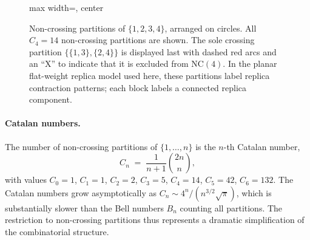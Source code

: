 \documentclass[11pt,letterpaper]{article}
\theoremstyle{plain}
\theoremstyle{definition}
\theoremstyle{remark}
\begin{document}
\begin{figure}[t]
\begin{adjustbox}{max width=\textwidth, center}
\end{adjustbox}
\caption{Non-crossing partitions of $\{1,2,3,4\}$, arranged on circles.
  All $C_4 = 14$ non-crossing partitions are shown.  The sole crossing
  partition $\{\{1,3\},\{2,4\}\}$ is displayed last with dashed red arcs
  and an ``X'' to indicate that it is excluded from $\mathrm{NC}(4)$.
  In the planar flat-weight replica model used here, these partitions label
  replica contraction patterns; each block labels a connected replica component.}
\label{fig07:nc_partitions}
\end{figure}


\paragraph{Catalan numbers.}
The number of non-crossing partitions of $\{1,\ldots,n\}$ is the $n$-th
Catalan number,
\begin{equation}
  C_n \;=\; \frac{1}{n+1}\binom{2n}{n},
  \label{eq07:catalan}
\end{equation}
with values $C_0 = 1$, $C_1 = 1$, $C_2 = 2$, $C_3 = 5$, $C_4 = 14$,
$C_5 = 42$, $C_6 = 132$.  The Catalan numbers grow asymptotically as
$C_n \sim 4^n / (n^{3/2}\sqrt{\pi})$, which is substantially slower than
the Bell numbers $B_n$ counting all partitions.  The restriction to
non-crossing partitions thus represents a dramatic simplification of the
combinatorial structure.
\end{document}
